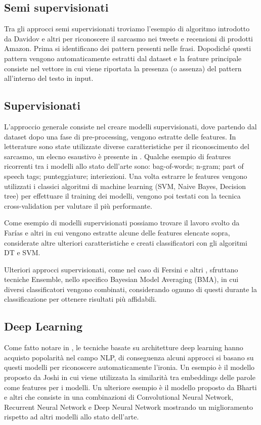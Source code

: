 \documentclass[oneside]{book}
\begin{document}
\subsection{Semi supervisionati}
Tra gli approcci semi supervisionati troviamo l'esempio di algoritmo introdotto da Davidov e altri \cite{davidov} per riconoscere il sarcasmo nei tweets e recensioni di prodotti Amazon. Prima si identificano dei pattern presenti nelle frasi. Dopodiché questi pattern vengono automaticamente estratti dal dataset e la feature principale consiste nel vettore in cui viene riportata la presenza (o assenza) del pattern all'interno del testo in input.
\subsection{Supervisionati}
L'approccio generale consiste nel creare modelli supervisionati, dove partendo dal dataset dopo una fase di pre-processing, vengono estratte delle features. In letterature sono state utilizzate diverse caratteristiche per il riconoscimento del sarcasmo, un elecno esaustivo è presente in \cite{survey2}. Qualche esempio di features ricorrenti tra i modelli allo stato dell'arte sono: bag-of-words; n-gram; part of speech tags; punteggiature; interiezioni. Una volta estrarre le features vengono utilizzati i classici algoritmi di machine learning (SVM, Naive Bayes, Decision tree) per effettuare il training dei modelli, vengono poi testati con la tecnica cross-validation per valutare il più performante.

Come esempio di modelli supervisionati possiamo trovare il lavoro svolto da Farías e altri \cite{farias} in cui vengono estratte alcune delle features elencate sopra, considerate altre ulteriori caratteristiche e creati classificatori con gli algoritmi DT e SVM.

Ulteriori approcci supervisionati, come nel caso di Fersini e altri \cite{fersini}, sfruttano tecniche Ensemble, nello specifico Bayesian Model Averaging (BMA), in cui diversi classificatori vengono combinati, considerando ognuno di questi durante la classificazione per ottenere risultati più affidabili.

\subsection{Deep Learning}
Come fatto notare in \cite{survey5}, le tecniche basate su architetture deep learning hanno acquisto popolarità nel campo NLP, di conseguenza alcuni approcci si basano su questi modelli per riconoscere automaticamente l'ironia. Un esempio è il modello proposto da Joshi \cite{embeddings} in cui viene utilizzata la similarità tra embeddings delle parole come features per i modelli. Un ulteriore esempio è il modello proposto da Bharti e altri \cite{deep-learning} che consiste in una combinazioni di Convolutional Neural Network, Recurrent Neural Network e Deep Neural Network mostrando un miglioramento rispetto ad altri modelli allo stato dell'arte.
\end{document}
